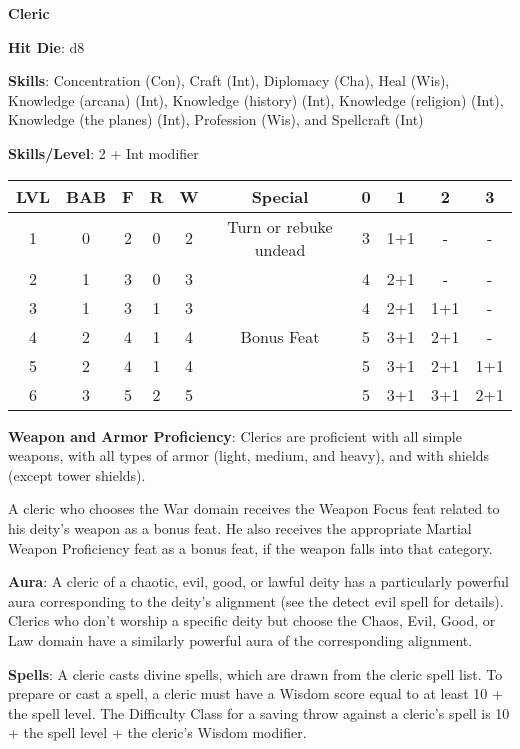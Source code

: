 \textbf{\huge{Cleric}}

\textbf{Hit Die}: d8

\textbf{Skills}: Concentration (Con), Craft (Int), Diplomacy (Cha), Heal (Wis), Knowledge (arcana) (Int), Knowledge (history) (Int), Knowledge (religion) (Int), Knowledge (the planes) (Int), Profession (Wis), and Spellcraft (Int)

\textbf{Skills/Level}: 2 + Int modifier

\begin{center}
\begin{adjustwidth}{-4cm}{}
\begin{small}
\begin{tabular}{| c | c | c | c | c | c | c | c | c | c |}
\hline
LVL &BAB &F &R &W &Special &0 &1 &2 &3 \\
\hline
1 &0 &2 &0 &2 &Turn or rebuke undead &3 &1+1 &- &- \\
2 &1 &3 &0 &3 & &4 &2+1 &- &- \\
3 &1 &3 &1 &3 & &4 &2+1 &1+1 &- \\
4 &2 &4 &1 &4 &Bonus Feat &5 &3+1 &2+1 &- \\
5 &2 &4 &1 &4 & &5 &3+1 &2+1 &1+1 \\
6 &3 &5 &2 &5 & &5 &3+1 &3+1 &2+1 \\
\hline
\end{tabular}
\end{small}
\end{adjustwidth}
\end{center}

\textbf{Weapon and Armor Proficiency}: Clerics are proficient with all simple weapons, with all types of armor (light, medium, and heavy), and with shields (except tower shields).

A cleric who chooses the War domain receives the Weapon Focus feat related to his deity’s weapon as a bonus feat. He also receives the appropriate Martial Weapon Proficiency feat as a bonus feat, if the weapon falls into that category.

\textbf{Aura}: A cleric of a chaotic, evil, good, or lawful deity has a particularly powerful aura corresponding to the deity’s alignment (see the detect evil spell for details). Clerics who don’t worship a specific deity but choose the Chaos, Evil, Good, or Law domain have a similarly powerful aura of the corresponding alignment.

\textbf{Spells}: A cleric casts divine spells, which are drawn from the cleric spell list. To prepare or cast a spell, a cleric must have a Wisdom score equal to at least 10 + the spell level. The Difficulty Class for a saving throw against a cleric’s spell is 10 + the spell level + the cleric’s Wisdom modifier.

